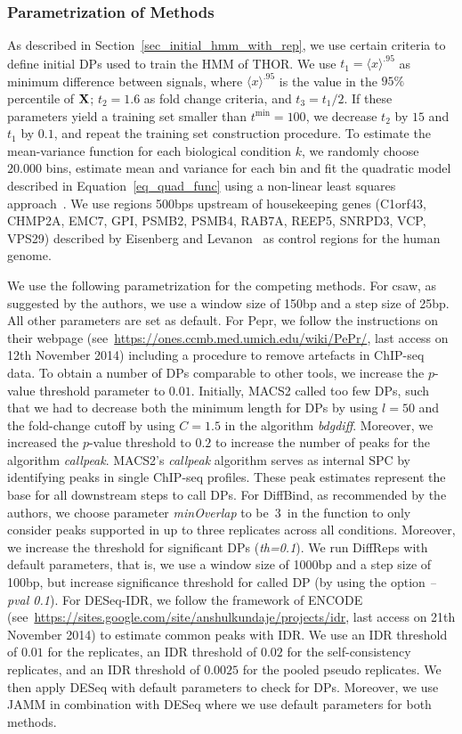 \subsubsection{Parametrization of Methods}
\label{sec_expmethods_with_biol_para}
As described in Section~\ref{sec_initial_hmm_with_rep}, we use certain criteria to define initial DPs used to train the HMM of THOR.
We use $t_1 = \langle x \rangle^{.95}$ as minimum difference between signals, where $\langle x \rangle^{.95}$ is the value in the $95\%$ percentile of  $\mathbf{X}$; $t_2=1.6$ as fold change criteria, and $t_3=t_1/2$.  
If these parameters yield a training set smaller than $t^{\min}=100$, we decrease $t_2$ by $15$ and $t_1$ by $0.1$, and repeat the training set construction procedure. 
To estimate the mean-variance function for each biological condition $k$, we randomly choose $20.000$ bins, estimate mean and variance for each bin and fit the quadratic model described in Equation~\ref{eq_quad_func} using a non-linear least squares approach~\citep{Levenberg1944}.
We use regions 500bps upstream of housekeeping genes (C1orf43, CHMP2A, EMC7, GPI, PSMB2, PSMB4, RAB7A, REEP5, SNRPD3, VCP, VPS29) described by Eisenberg and Levanon~\cite{Eisenberg2013} as control regions for the human genome. 

We use the following parametrization for the competing methods.
For csaw, as suggested by the authors, we use a window size of 150bp and a step size of 25bp.  
All other parameters are set as default. 
For Pepr, we follow the instructions on their webpage (see~\url{https://ones.ccmb.med.umich.edu/wiki/PePr/}, last access on 12th November 2014) including a procedure to remove artefacts in ChIP-seq data.
To obtain a number of DPs comparable to other tools, we increase the $p$-value threshold parameter to $0.01$.
Initially, MACS2 called too few DPs, such that we had to decrease both the minimum length for DPs by using $l=50$ and the fold-change cutoff by using $C=1.5$ in the algorithm \textit{bdgdiff}.
Moreover, we increased the $p$-value threshold to $0.2$ to increase the number of peaks for the algorithm \textit{callpeak}. 
MACS2's \textit{callpeak} algorithm serves as internal SPC by identifying peaks in single ChIP-seq profiles.
These peak estimates represent the base for all downstream steps to call DPs.
For DiffBind, as recommended by the authors, we choose parameter \textit{minOverlap} to be~$3$~in the  function to only consider peaks supported in up to three replicates across all conditions. 
Moreover, we increase the threshold for significant DPs (\textit{th=0.1}).
We run DiffReps with default parameters, that is, we use a window size of 1000bp and a step size of 100bp, but increase significance threshold for called DP (by using the option \textit{--pval 0.1}).
For DESeq-IDR, we follow the framework of ENCODE (see~\url{https://sites.google.com/site/anshulkundaje/projects/idr}, last access on 21th November 2014) to estimate common peaks with IDR.
We use an IDR threshold of $0.01$ for the replicates, an IDR threshold of $0.02$ for the self-consistency replicates, and an IDR  threshold of $0.0025$ for the pooled pseudo replicates.
We then apply DESeq with default parameters to check for DPs. 
Moreover, we use JAMM in combination with DESeq where we use default parameters for both methods.

